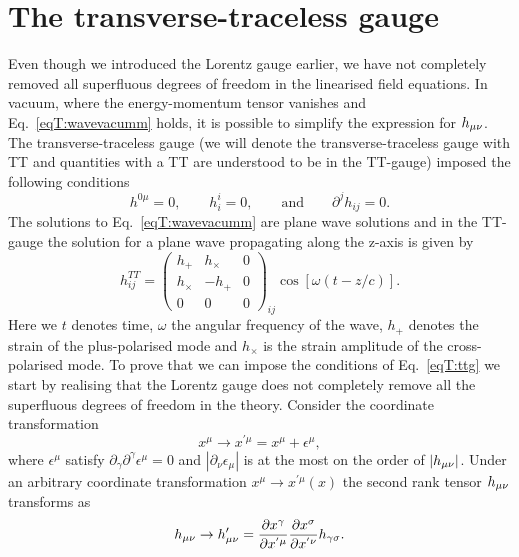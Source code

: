 \section{The transverse-traceless gauge}
Even though we introduced the Lorentz gauge earlier, we have not completely removed all superfluous degrees of freedom 
in the linearised field equations. In vacuum, where the energy-momentum tensor vanishes and Eq.~\ref{eqT:wavevacumm} holds, it is possible
to simplify the expression for $h_{\mu\nu}$. The transverse-traceless gauge (we will denote the transverse-traceless gauge
with TT and quantities with a TT are understood to be in the TT-gauge) imposed the following conditions
\begin{equation} \label{eqT:ttg}
h^{0 \mu} = 0, \qquad h^{i}_{i} = 0, \qquad \text{and} \qquad \partial^j h_{ij} = 0.
\end{equation}
The solutions to Eq.~\ref{eqT:wavevacumm} are plane wave solutions and in the TT-gauge the 
solution for a plane wave propagating along the z-axis is given by
\begin{equation} \label{eqT:hzdir}
h_{ij}^{TT}=
  \begin{pmatrix}
    h_{+} & h_{\times} & 0  \\
    h_{\times} & -h_{+} & 0 \\
    0 & 0 & 0
  \end{pmatrix}_{ij}
  \cos[\omega(t - z/c)].
\end{equation}
Here we $t$ denotes time, $\omega$ the angular frequency of the wave,
$h_+$ denotes the strain of the plus-polarised mode and $h_{\times}$ is the strain amplitude of the cross-polarised mode.
To prove that we can impose the conditions of Eq.~\ref{eqT:ttg} we start by
realising that the Lorentz gauge does not completely remove all the superfluous degrees of freedom in the theory. Consider the 
coordinate transformation 
\begin{equation} \label{eqT:ct}
x^{\mu} \rightarrow x^{'\mu} = x^{\mu} + \epsilon^{\mu},
\end{equation}
where $\epsilon^{\mu}$ satisfy $\partial_{\gamma} \partial^{\gamma} \epsilon^{\mu} = 0$ 
and $|\partial_{\nu} \epsilon_{\mu}|$ is at the most on the order of $|h_{\mu\nu}|$.
Under an arbitrary coordinate transformation $x^{\mu} \rightarrow x^{'\mu}(x)$ the second rank tensor $h_{\mu\nu}$ transforms as
\begin{equation} \label{eqT:t2c}
h_{\mu\nu} \rightarrow h'_{\mu\nu} = \frac{\partial x^{\gamma}}{\partial x^{'\mu}} \frac{\partial x^{\sigma}}{\partial x^{'\nu}} h_{\gamma \sigma}.
\end{equation}

